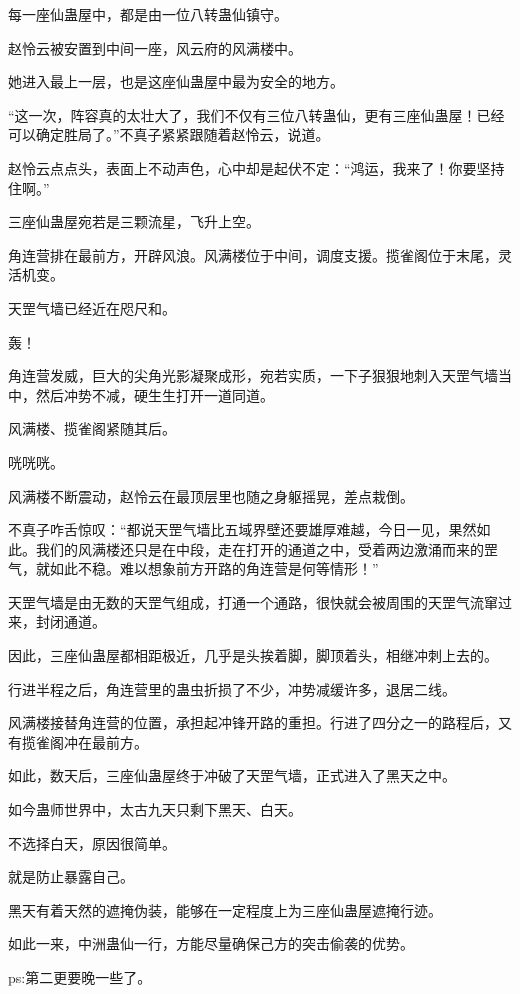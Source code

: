 \begin{this_body}
每一座仙蛊屋中，都是由一位八转蛊仙镇守。

赵怜云被安置到中间一座，风云府的风满楼中。

她进入最上一层，也是这座仙蛊屋中最为安全的地方。

“这一次，阵容真的太壮大了，我们不仅有三位八转蛊仙，更有三座仙蛊屋！已经可以确定胜局了。”不真子紧紧跟随着赵怜云，说道。

赵怜云点点头，表面上不动声色，心中却是起伏不定：“鸿运，我来了！你要坚持住啊。”

三座仙蛊屋宛若是三颗流星，飞升上空。

角连营排在最前方，开辟风浪。风满楼位于中间，调度支援。揽雀阁位于末尾，灵活机变。

天罡气墙已经近在咫尺和。

轰！

角连营发威，巨大的尖角光影凝聚成形，宛若实质，一下子狠狠地刺入天罡气墙当中，然后冲势不减，硬生生打开一道同道。

风满楼、揽雀阁紧随其后。

咣咣咣。

风满楼不断震动，赵怜云在最顶层里也随之身躯摇晃，差点栽倒。

不真子咋舌惊叹：“都说天罡气墙比五域界壁还要雄厚难越，今日一见，果然如此。我们的风满楼还只是在中段，走在打开的通道之中，受着两边激涌而来的罡气，就如此不稳。难以想象前方开路的角连营是何等情形！”

天罡气墙是由无数的天罡气组成，打通一个通路，很快就会被周围的天罡气流窜过来，封闭通道。

因此，三座仙蛊屋都相距极近，几乎是头挨着脚，脚顶着头，相继冲刺上去的。

行进半程之后，角连营里的蛊虫折损了不少，冲势减缓许多，退居二线。

风满楼接替角连营的位置，承担起冲锋开路的重担。行进了四分之一的路程后，又有揽雀阁冲在最前方。

如此，数天后，三座仙蛊屋终于冲破了天罡气墙，正式进入了黑天之中。

如今蛊师世界中，太古九天只剩下黑天、白天。

不选择白天，原因很简单。

就是防止暴露自己。

黑天有着天然的遮掩伪装，能够在一定程度上为三座仙蛊屋遮掩行迹。

如此一来，中洲蛊仙一行，方能尽量确保己方的突击偷袭的优势。

ps:第二更要晚一些了。

\end{this_body}

